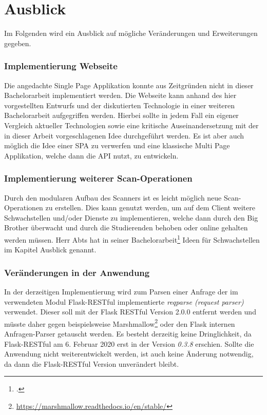 \section{Ausblick}
\label{sec:Ausblick}
Im Folgenden wird ein Ausblick auf mögliche Veränderungen und Erweiterungen gegeben.

\subsubsection{Implementierung Webseite}
Die angedachte Single Page Applikation konnte aus Zeitgründen nicht in dieser Bachelorarbeit implementiert werden. Die Webseite kann anhand des hier vorgestellten Entwurfs und der diskutierten Technologie in einer weiteren Bachelorarbeit aufgegriffen werden. Hierbei sollte in jedem Fall ein eigener Vergleich aktueller Technologien sowie eine kritische Auseinandersetzung mit der in dieser Arbeit vorgeschlagenen Idee durchgeführt werden. Es ist aber auch möglich die Idee einer SPA zu verwerfen und eine klassische Multi Page Applikation, welche dann die API nutzt, zu entwickeln.

\subsubsection{Implementierung weiterer Scan-Operationen}
Durch den modularen Aufbau des Scanners ist es leicht möglich neue Scan-Operationen zu erstellen. Dies kann genutzt werden, um auf dem Client weitere Schwachstellen und/oder Dienste zu implementieren, welche dann durch den Big Brother überwacht und durch die Studierenden behoben oder online gehalten werden müssen. Herr Abts hat in seiner Bachelorarbeit\footcite{abtsUeberarbeitungUndErweiterung2016} Ideen für Schwachstellen im Kapitel Ausblick genannt. 

\subsubsection{Veränderungen in der Anwendung}
In der derzeitigen Implementierung wird zum Parsen einer Anfrage der im verwendeten Modul Flask-RESTful implementierte \textit{reqparse (request parser)} verwendet. Dieser soll mit der Flask RESTful Version 2.0.0 entfernt werden und müsste daher gegen beispielsweise Marshmallow\footnote{\url{https://marshmallow.readthedocs.io/en/stable/}} oder den Flask internen Anfragen-Parser getauscht werden. Es besteht derzeitig keine Dringlichkeit, da Flask-RESTful am 6. Februar 2020 erst in der Version \textit{0.3.8} erschien. Sollte die Anwendung nicht weiterentwickelt werden, ist auch keine Änderung notwendig, da dann die Flask-RESTful Version unverändert bleibt.

